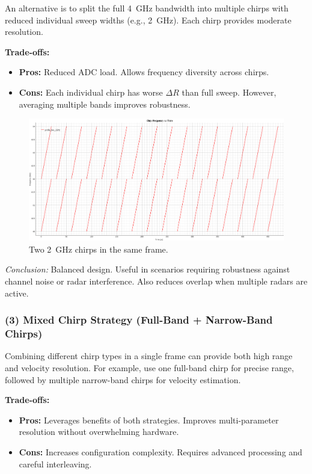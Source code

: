 An alternative is to split the full 4~GHz bandwidth into multiple chirps with reduced individual sweep widths (e.g., 2~GHz).
Each chirp provides moderate resolution.

\textbf{Trade-offs:}
\begin{itemize}
    \item \textbf{Pros:} Reduced ADC load. Allows frequency diversity across chirps.
    \item \textbf{Cons:} Each individual chirp has worse $\Delta R$ than full sweep. However, averaging multiple bands improves robustness.
\end{itemize}

\begin{figure}[!htbp]
    \centering
    \includegraphics[width=1.0\linewidth]{images/profile_two_2GHz.png}
    \caption{Two 2~GHz chirps in the same frame.}
    \label{fig:profile2GHz}
\end{figure}

{\small
\textit{Conclusion:} Balanced design.
Useful in scenarios requiring robustness against channel noise or radar interference.
Also reduces overlap when multiple radars are active.
}

\vspace{1em}

\subsubsection*{(3) Mixed Chirp Strategy (Full-Band + Narrow-Band Chirps)}

Combining different chirp types in a single frame can provide both high range and velocity resolution.
For example, use one full-band chirp for precise range, followed by multiple narrow-band chirps for velocity estimation.

\textbf{Trade-offs:}
\begin{itemize}
    \item \textbf{Pros:} Leverages benefits of both strategies. Improves multi-parameter resolution without overwhelming hardware.
    \item \textbf{Cons:} Increases configuration complexity. Requires advanced processing and careful interleaving.
\end{itemize}

